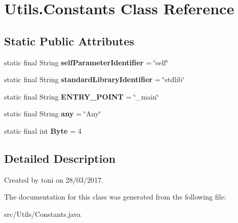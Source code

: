 \hypertarget{class_utils_1_1_constants}{}\section{Utils.\+Constants Class Reference}
\label{class_utils_1_1_constants}
\subsection*{Static Public Attributes}
\begin{DoxyCompactItemize}
\item 
\mbox{\label{class_utils_1_1_constants_abaa83f6055fb3c20de0660958e9a932e}} 
static final String {\bfseries self\+Parameter\+Identifier} = \char`\"{}self\char`\"{}
\item 
\mbox{\label{class_utils_1_1_constants_adf81062add00520137c659701e3b230f}} 
static final String {\bfseries standard\+Library\+Identifier} = \char`\"{}stdlib\char`\"{}
\item 
\mbox{\label{class_utils_1_1_constants_af45ba4f81764226347ac42715229c7d6}} 
static final String {\bfseries E\+N\+T\+R\+Y\+\_\+\+P\+O\+I\+NT} = \char`\"{}\+\_\+main\char`\"{}
\item 
\mbox{\label{class_utils_1_1_constants_aabaf294074765dcd0f1439a4afc26440}} 
static final String {\bfseries any} = \char`\"{}Any\char`\"{}
\item 
\mbox{\label{class_utils_1_1_constants_a156657b3131b2d7c0c319d7183e514f6}} 
static final int {\bfseries Byte} = 4
\end{DoxyCompactItemize}


\subsection{Detailed Description}
Created by toni on 28/03/2017. 

The documentation for this class was generated from the following file\+:\begin{DoxyCompactItemize}
\item 
src/\+Utils/Constants.\+java\end{DoxyCompactItemize}
